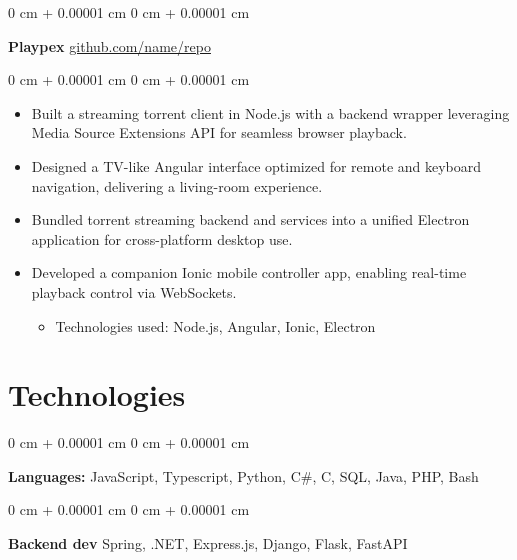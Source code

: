 \documentclass[10pt, letterpaper]{article}
\newenvironment{highlights}{
  \begin{itemize}[
    topsep=0.10 cm,
    parsep=0.10 cm,
    partopsep=0pt,
    itemsep=0pt,
    leftmargin=0 cm + 10pt
    ]
  }{
\end{itemize}
} %
\newenvironment{highlightsforbulletentries}{
  \begin{itemize}[
    topsep=0.10 cm,
    parsep=0.10 cm,
    partopsep=0pt,
    itemsep=0pt,
    leftmargin=10pt
    ]
  }{
\end{itemize}
} %
\newenvironment{onecolentry}{
  \begin{adjustwidth}{
      0 cm + 0.00001 cm
    }{
      0 cm + 0.00001 cm
    }
  }{
  \end{adjustwidth}
} %
\newenvironment{twocolentry}[2][]{
  \onecolentry
  \def\secondColumn{#2}
  \setcolumnwidth{\fill, 4.5 cm}
  \begin{paracol}{2}
  }{
    \switchcolumn \raggedleft \secondColumn
  \end{paracol}
  \endonecolentry
} %
\begin{document}
  \vspace{0.2 cm}

  \begin{twocolentry}{
      \href{https://github.com/sinaatalay/rendercv}{github.com/name/repo}
    }
  \textbf{Playpex}\end{twocolentry}

  \vspace{0.10 cm}
  \begin{onecolentry}
    \begin{highlights}
\item Built a streaming torrent client in Node.js with a backend wrapper leveraging Media Source Extensions API for seamless browser playback.
\item Designed a TV-like Angular interface optimized for remote and keyboard navigation, delivering a living-room experience.
\item Bundled torrent streaming backend and services into a unified Electron application for cross-platform desktop use.
\item Developed a companion Ionic mobile controller app, enabling real-time playback control via WebSockets.

                \begin{highlightsforbulletentries}
    \item Technologies used: Node.js, Angular, Ionic, Electron
    \end{highlightsforbulletentries}

    \end{highlights}
  \end{onecolentry}


  \section{Technologies}




  \begin{onecolentry}
    \textbf{Languages:} JavaScript, Typescript, Python, C\#, C, SQL, Java, PHP, Bash
  \end{onecolentry}

  \vspace{0.2 cm}

  \begin{onecolentry}
    \textbf{Backend dev} Spring, .NET, Express.js, Django, Flask, FastAPI
  \end{onecolentry}

  \vspace{0.2 cm}
\end{document}
